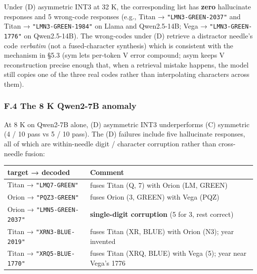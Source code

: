 Under (D) asymmetric INT3 at 32 K, the corresponding list has
\textbf{zero} hallucinate responses and 5 wrong-code responses (e.g.,
Titan → \texttt{"LMN3-GREEN-2037"} and Titan →
\texttt{"LMN3-GREEN-1984"} on Llama and Qwen2.5-14B; Vega →
\texttt{"LMN3-GREEN-1776"} on Qwen2.5-14B). The wrong-codes under (D)
retrieve a distractor needle's code \emph{verbatim} (not a
fused-character synthesis) which is consistent with the mechanism in
§5.3 (sym lets per-token V error compound; asym keeps V reconstruction
precise enough that, when a retrieval mistake happens, the model still
copies one of the three real codes rather than interpolating characters
across them).

\subsubsection{F.4 The 8 K Qwen2-7B
anomaly}\label{f.4-the-8-k-qwen2-7b-anomaly}

At 8 K on Qwen2-7B alone, (D) asymmetric INT3 underperforms (C)
symmetric (4 / 10 pass vs 5 / 10 pass). The (D) failures include five
hallucinate responses, all of which are within-needle digit / character
corruption rather than cross-needle fusion:

{\def\LTcaptype{none} %
\begin{longtable}[]{@{}
  >{\raggedright\arraybackslash}p{}
  >{\raggedright\arraybackslash}p{}@{}}
\toprule\noalign{}
\begin{minipage}[b]{\linewidth}\raggedright
target → decoded
\end{minipage} & \begin{minipage}[b]{\linewidth}\raggedright
Comment
\end{minipage} \\
\midrule\noalign{}
\endhead
\bottomrule\noalign{}
\endlastfoot
Titan → \texttt{"LMQ7-GREEN"} & fuses Titan (Q, 7) with Orion (LM,
GREEN) \\
Orion → \texttt{"PQZ3-GREEN"} & fuses Orion (3, GREEN) with Vega
(PQZ) \\
Orion → \texttt{"LMN5-GREEN-2037"} & \textbf{single-digit corruption} (5
for 3, rest correct) \\
Titan → \texttt{"XRN3-BLUE-2019"} & fuses Titan (XR, BLUE) with Orion
(N3); year invented \\
Titan → \texttt{"XRQ5-BLUE-1770"} & fuses Titan (XRQ, BLUE) with Vega
(5); year near Vega's 1776 \\
\end{longtable}
}

